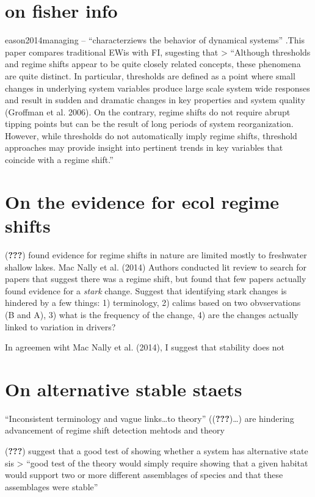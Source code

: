\documentclass[12pt,twoside,openany]{reedthesis}
\begin{document}
\section{on fisher info}\label{on-fisher-info}

eason2014managing -- ``characterziews the behavior of dynamical
systems'' .This paper compares traditional EWis with FI, sugesting that
\textgreater{} ``Although thresholds and regime shifts appear to be
quite closely related concepts, these phenomena are quite distinct. In
particular, thresholds are defined as a point where small changes in
underlying system variables produce large scale system wide responses
and result in sudden and dramatic changes in key properties and system
quality (Groffman et al. 2006). On the contrary, regime shifts do not
require abrupt tipping points but can be the result of long periods of
system reorganization. However, while thresholds do not automatically
imply regime shifts, threshold approaches may provide insight into
pertinent trends in key variables that coincide with a regime shift.''

\section{On the evidence for ecol regime
shifts}\label{on-the-evidence-for-ecol-regime-shifts}

({\textbf{???}}) found evidence for regime shifts in nature are limited
mostly to freshwater shallow lakes. Mac Nally et al. (2014) Authors
conducted lit review to search for papers that suggest there was a
regime shift, but found that few papers actually found evidence for a
\emph{stark} change. Suggest that identifying stark changes is hindered
by a few things: 1) terminology, 2) calims based on two obvservations (B
and A), 3) what is the frequency of the change, 4) are the changes
actually linked to variation in drivers?

In agreemen wiht Mac Nally et al. (2014), I suggest that stability does
not

\section{On alternative stable
staets}\label{on-alternative-stable-staets}

``Inconsistent terminology and vague links\ldots{}to theory''
(({\textbf{???}})\ldots{}) are hindering advancement of regime shift
detection mehtods and theory

({\textbf{???}}) suggest that a good test of showing whether a system
has alternative state sis \textgreater{} ``good test of the theory would
simply require showing that a given habitat would support two or more
different assemblages of species and that these assemblages were
stable''
\end{document}
